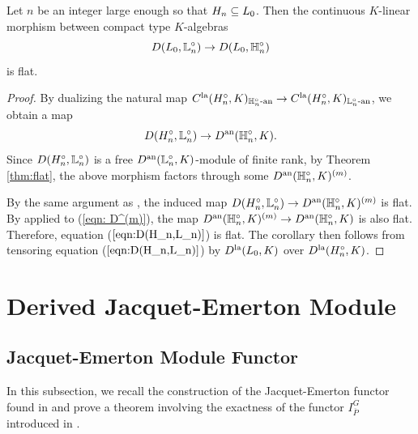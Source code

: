 \documentclass[10pt]{amsart}
\begin{document}
\begin{corollary}\label{cor:flat}
Let $n$ be an integer large enough so that $H_{n}\subseteq L_{0}$. Then the continuous $K$-linear morphism between compact type $K$-algebras \begin{equation*}
    D(L_{0},\mathbb{L}_{n}^{\circ}) \rightarrow D(L_{0},\mathbb{H}_{n}^{\circ}) 
\end{equation*}
is flat.
\end{corollary}
\begin{proof} By dualizing the natural map $C^{\textnormal{la}}(H_{n}^{\circ},K)_{\mathbb{H}_{n}^{\circ}\textnormal{-an}}\rightarrow C^{\textnormal{la}}(H_{n}^{\circ},K)_{\mathbb{L}_{n}^{\circ}\textnormal{-an}}$, we obtain a map \begin{equation}\label{eqn:D(H_n,L_n)}
    D(H_{n}^{\circ},\mathbb{L}_{n}^{\circ}) \rightarrow D^{\textnormal{an}}(\mathbb{H}_{n}^{\circ},K). 
\end{equation} Since $D(H_{n}^{\circ},\mathbb{L}_{n}^{\circ})$ is a free $D^{\textnormal{an}}(\mathbb{L}_{n}^{\circ},K)$-module of finite rank, by Theorem \ref{thm:flat}, the above morphism factors through some $D^{\textnormal{an}}(\mathbb{H}_{n}^{\circ},K)^{(m)}$. 

By the same argument as \cite[Prop. 5.3.18]{analytic}, the induced map $D(H_{n}^{\circ},\mathbb{L}_{n}^{\circ})\rightarrow D^{\textnormal{an}}(\mathbb{H}_{n}^{\circ},K)^{(m)}$ is flat. By \cite[Rem. 3.2]{ST_dist} applied to (\ref{eqn: D^(m)}), the map $D^{\textnormal{an}}(\mathbb{H}_{n}^{\circ},K)^{(m)} \rightarrow  D^{\textnormal{an}}(\mathbb{H}_{n}^{\circ},K)$ is also flat. Therefore, equation ($\ref{eqn:D(H_n,L_n)}$) is flat. The corollary then follows from tensoring equation ($\ref{eqn:D(H_n,L_n)}$) by $D^{\textnormal{la}}(L_{0},K)$ over $D^{\textnormal{la}}(H_{n}^{\circ},K)$. 
\end{proof}



\vspace{3mm}
\section{Derived Jacquet-Emerton Module}\label{sec:derived}

\vspace{3mm}

\subsection{Jacquet-Emerton Module Functor}

In this subsection, we recall the construction of the Jacquet-Emerton functor found in \cite{Jacquet1} and prove a theorem involving the exactness of the functor $I_{\overline{P}}^{G}$ introduced in \cite{Jacquet2}. 
\end{document}

